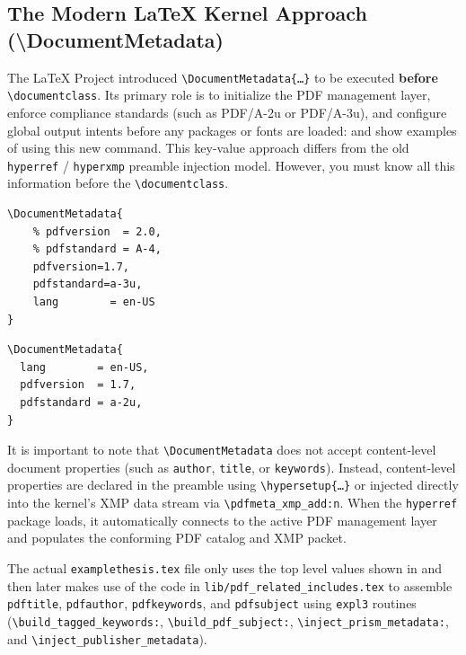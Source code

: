 \documentclass[12pt, twoside]{article}
\newcommand{\fname}[1]{\texttt{#1}}
\begin{document}
\subsection{The Modern LaTeX Kernel Approach (\textbackslash DocumentMetadata)}
\label{sec:ModernMetadataApproach}
The \LaTeX{} Project introduced \texttt{\textbackslash DocumentMetadata\{\dots\}} to be executed \textbf{before} \texttt{\textbackslash documentclass}. Its primary role is to initialize the PDF management layer, enforce compliance standards (such as PDF/A-2u or  PDF/A-3u), and configure global output intents before any packages or fonts are loaded:  and  show examples of using this new command. This key-value approach differs from the old \texttt{hyperref} / \texttt{hyperxmp} preamble injection model. However, you must know all this information before the \texttt{\textbackslash documentclass}.

\begin{lstlisting}[language={[LaTeX]TeX}, caption={Example of using \texttt{\textbackslash DocumentMetadata}}, label=lst:exampleDocumentMetadata]
\DocumentMetadata{
    % pdfversion  = 2.0,
    % pdfstandard = A-4,
    pdfversion=1.7,
    pdfstandard=a-3u,
    lang        = en-US
}
\end{lstlisting}

\begin{lstlisting}[language={[LaTeX]TeX}, caption={Second example of using \texttt{\textbackslash DocumentMetadata}}, label=lst:anotherExampleDocumentMetadata]
\DocumentMetadata{
  lang        = en-US,
  pdfversion  = 1.7,
  pdfstandard = a-2u,
}
\end{lstlisting}

It is important to note that \texttt{\textbackslash DocumentMetadata} does not accept content-level document properties (such as \texttt{author}, \texttt{title}, or \texttt{keywords}). Instead, content-level properties are declared in the preamble using \texttt{\textbackslash hypersetup\{\dots\}} or injected directly into the kernel's \gls{XMP} data stream via \texttt{\textbackslash pdfmeta\_xmp\_add:n}. When the \texttt{hyperref} package loads, it automatically connects to the active \gls{PDF} management layer and populates the conforming \gls{PDF} catalog and \gls{XMP} packet.

The actual \fname{examplethesis.tex} file only uses the top level values shown in  and then later makes use of the code in \fname{lib/pdf\_related\_includes.tex} to assemble \texttt{pdftitle}, \texttt{pdfauthor}, \texttt{pdfkeywords}, and \texttt{pdfsubject} using \texttt{expl3} routines (\texttt{\textbackslash build\_tagged\_keywords:}, \texttt{\textbackslash build\_pdf\_subject:}, \texttt{\textbackslash inject\_prism\_metadata:}, and \texttt{\textbackslash inject\_publisher\_metadata}).
\end{document}
